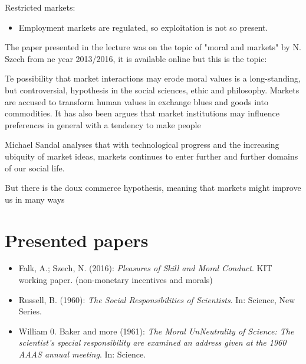Restricted markets:

\begin{itemize}
	\item Employment markets are regulated, so exploitation is not so present.
\end{itemize}



The paper presented in the lecture was on the topic of "moral and markets" by N. Szech from ne year 2013/2016, it is available online but this is the topic:


Te possibility that market interactions may erode moral values is a long-standing, but controversial, hypothesis in the social sciences, ethic and philosophy. Markets are accused to transform human values in exchange blues and goods into commodities. It has also been argues that market institutions may influence preferences in general with a tendency to make people

Michael Sandal analyses that with technological progress and the increasing ubiquity of market ideas, markets continues to enter further and further domains of our social life.



But there is the doux commerce hypothesis, meaning that markets might improve us in many ways


\section{Presented papers}

\begin{itemize}
	\item Falk, A.; Szech, N. (2016): \textit{Pleasures of Skill and Moral Conduct}. KIT working paper. (non-monetary incentives and morals)
	\item Russell, B. (1960): \textit{The Social Responsibilities of Scientists}. In: Science, New Series.
	\item William 0. Baker and more (1961): \textit{The Moral UnNeutrality of Science: The scientist's special responsibility are examined an address given at the 1960 AAAS annual meeting}. In: Science.
\end{itemize}


\newpage
